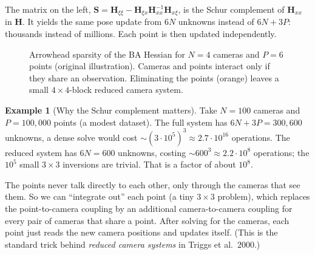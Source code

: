 \documentclass[11pt,a4paper]{article}
\theoremstyle{definition}
\newtheorem{example}[definition]{Example}
\theoremstyle{plain}
\theoremstyle{remark}
\begin{document}
The matrix on the left, $\bm S=\bm H_{\xi\xi}-\bm H_{\xi x}\bm H_{xx}^{-1}\bm H_{x\xi}$, is the Schur complement of $\bm H_{xx}$ in $\bm H$. It yields the same pose update from $6N$ unknowns instead of $6N+3P$: thousands instead of millions. Each point is then updated independently.

\begin{figure}[H]
\centering
{}
\caption{Arrowhead sparsity of the BA Hessian for $N=4$ cameras and $P=6$ points (original illustration). Cameras and points interact only if they share an observation. Eliminating the points (orange) leaves a small $4\times4$-block reduced camera system.}
\end{figure}

\begin{example}[Why the Schur complement matters]\label{ex:schurnum}
Take $N=100$ cameras and $P=100{,}000$ points (a modest dataset). The full system has $6N+3P=300{,}600$ unknowns, a dense solve would cost $\sim(3\cdot10^5)^3\approx2.7\cdot10^{16}$ operations.
The reduced system has $6N=600$ unknowns, costing $\sim600^3\approx2.2\cdot10^8$ operations; the $10^5$ small $3\times3$ inversions are trivial.
That is a factor of about $10^8$.
\end{example}

\begin{intuition}
The points never talk directly to each other, only through the cameras that see them. So we can ``integrate out'' each point (a tiny $3\times3$ problem), which replaces the point-to-camera coupling by an additional camera-to-camera coupling for every pair of cameras that share a point. After solving for the cameras, each point just reads the new camera positions and updates itself. (This is the standard trick behind \emph{reduced camera systems} in Triggs et al.\ 2000.)
\end{intuition}
\end{document}
